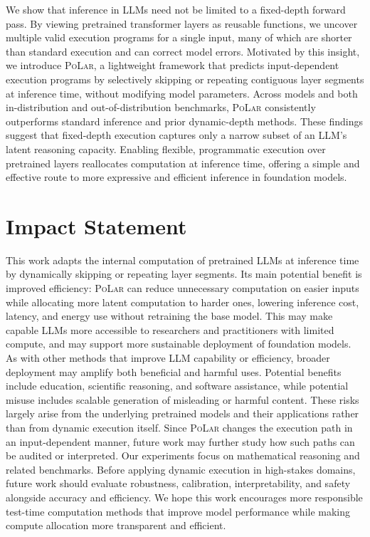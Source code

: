 \documentclass{article}
\theoremstyle{plain}
\theoremstyle{definition}
\theoremstyle{remark}
\newcommand\ours{\textsc{PoLar}\xspace}
\begin{document}
We show that inference in LLMs need not be limited to a fixed-depth forward pass.
By viewing pretrained transformer layers as reusable functions, we uncover multiple valid execution programs for a single input, many of which are shorter than standard execution and can correct model errors.
Motivated by this insight, we introduce \ours, a lightweight framework that predicts input-dependent execution programs by selectively skipping or repeating contiguous layer segments at inference time, without modifying model parameters.
Across models and both in-distribution and out-of-distribution benchmarks, \ours consistently outperforms standard inference and prior dynamic-depth methods.
These findings suggest that fixed-depth execution captures only a narrow subset of an LLM’s latent reasoning capacity.
Enabling flexible, programmatic execution over pretrained layers reallocates computation at inference time, offering a simple and effective route to more expressive and efficient inference in foundation models.


\section*{Impact Statement}

This work adapts the internal computation of pretrained LLMs at inference time by dynamically skipping or repeating layer segments. Its main potential benefit is improved efficiency: \ours can reduce unnecessary computation on easier inputs while allocating more latent computation to harder ones, lowering inference cost, latency, and energy use without retraining the base model. This may make capable LLMs more accessible to researchers and practitioners with limited compute, and may support more sustainable deployment of foundation models.
As with other methods that improve LLM capability or efficiency, broader deployment may amplify both beneficial and harmful uses. Potential benefits include education, scientific reasoning, and software assistance, while potential misuse includes scalable generation of misleading or harmful content. These risks largely arise from the underlying pretrained models and their applications rather than from dynamic execution itself. Since \ours changes the execution path in an input-dependent manner, future work may further study how such paths can be audited or interpreted.
Our experiments focus on mathematical reasoning and related benchmarks. Before applying dynamic execution in high-stakes domains, future work should evaluate robustness, calibration, interpretability, and safety alongside accuracy and efficiency. We hope this work encourages more responsible test-time computation methods that improve model performance while making compute allocation more transparent and efficient.
\end{document}
